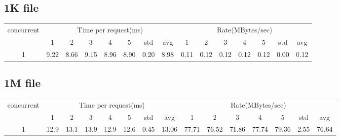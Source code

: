 \documentclass{article}
\begin{document}
\subsection*{1K file}
\begin{table}[H]
    \begin{tabular}{|c|c|c|c|c|c|c|c|c|c|c|c|c|c|c|}
        \hline
        \multirow{2}{*}{concurrent} & \multicolumn{7}{c|}{Time per request(ms)} & \multicolumn{7}{c|}{Rate(MBytes/sec)}                                                                                     \\ \cline{2-15}
                                    & 1                                         & 2                                     & 3    & 4    & 5    & std  & avg  & 1    & 2    & 3    & 4    & 5    & std  & avg  \\ \hline
        1                           & 9.22                                      & 8.66                                  & 9.15 & 8.96 & 8.90 & 0.20 & 8.98 & 0.11 & 0.12 & 0.12 & 0.12 & 0.12 & 0.00 & 0.12 \\ \hline
    \end{tabular}
\end{table}
\subsection*{1M file}
\begin{table}[H]
    \begin{tabular}{|c|c|c|c|c|c|c|c|c|c|c|c|c|c|c|}
        \hline
        \multirow{2}{*}{concurrent} & \multicolumn{7}{c|}{Time per request(ms)} & \multicolumn{7}{c|}{Rate(MBytes/sec)}                                                                                            \\ \cline{2-15}
                                    & 1                                         & 2                                     & 3    & 4    & 5    & std  & avg   & 1     & 2     & 3     & 4     & 5     & std  & avg   \\ \hline
        1                           & 12.9                                      & 13.1                                  & 13.9 & 12.9 & 12.6 & 0.45 & 13.06 & 77.71 & 76.52 & 71.86 & 77.74 & 79.36 & 2.55 & 76.64 \\ \hline
    \end{tabular}
\end{table}
\end{document}
